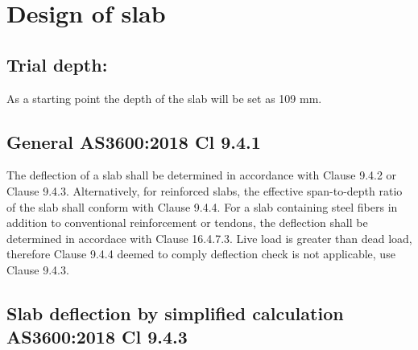\documentclass{article}%
\begin{document}
%
\normalsize%
\section*{Design of slab}%
\label{sec:Designofslab}%
\subsection*{Trial depth:}%
\label{subsec:Trialdepth}%

%
As a starting point the depth of the slab will be set as 109 mm.%
\subsection*{General AS3600:2018 Cl 9.4.1}%
\label{subsec:GeneralAS36002018Cl9.4.1}%

%
The deflection of a slab shall be determined in accordance with Clause 9.4.2 or Clause 9.4.3.\newline%
\newline%
Alternatively, for reinforced slabs, the effective span{-}to{-}depth ratio of the slab shall conform with Clause 9.4.4.\newline%
\newline%
For a slab containing steel fibers in addition to conventional reinforcement or tendons, the deflection shall be determined in accordace with Clause 16.4.7.3.\newline%
%
\newline%
 Live load is greater than dead load, therefore Clause 9.4.4 deemed to comply deflection check is not applicable, use Clause 9.4.3.%
\subsection*{Slab deflection by simplified calculation  AS3600:2018 Cl 9.4.3}%
\label{subsec:SlabdeflectionbysimplifiedcalculationAS36002018Cl9.4.3}%
\end{document}
